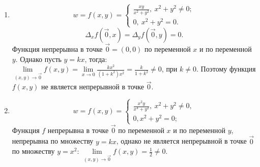 \documentclass[a4paper,14pt]{extreport}
\begin{document}
\begin{enumerate}
	\item $$w = f(x, y) = 
		\begin{cases}
			\frac{xy}{x^2 + y^2}, ~ x^2 + y^2 \neq 0;
			\\0, ~ x^2 + y^2 = 0.
		\end{cases}
		$$
		$$\Delta_xf(\vec{0}, x) = \Delta_yf(\vec{0}, y) = 0.$$
		Функция непрерывна в точке $\vec{0} = (0, 0)$ по переменной $x$ и по переменной $y$.
		Однако пусть $y = kx$, тогда:
		\\[3mm]$\lim\limits_{(x, y) \to \vec{0}}f(x, y) = \lim\limits_{x \to 0}\frac{kx^2}{(1 + k^2)x^2} =
		\frac{k}{1+k^2} \neq 0$, при $k \neq 0$. Поэтому функция $f(x, y)$ не является непрерывной в точке $\vec{0}$.
	\item $$w = f(x, y) = 
		\begin{cases}
			\frac{x^2y}{x^4+y^2}, ~x^2 + y^2 \neq 0,
			\\0, x^2 + y^2 = 0;
		\end{cases}
		$$
		Функция $f$ непрерывна в точке $\vec{0}$ по переменной $x$ и по переменной $y$,
		непрерывна по множеству $y = kx$, однако не является непрерывной в точке $\vec{0}$
		по множеству $y = x^2$:
		$\lim\limits_{(x, y) \to \vec{0}}f(x, y) = \frac{1}{2} \neq 0$.
\end{enumerate}
\end{document}
